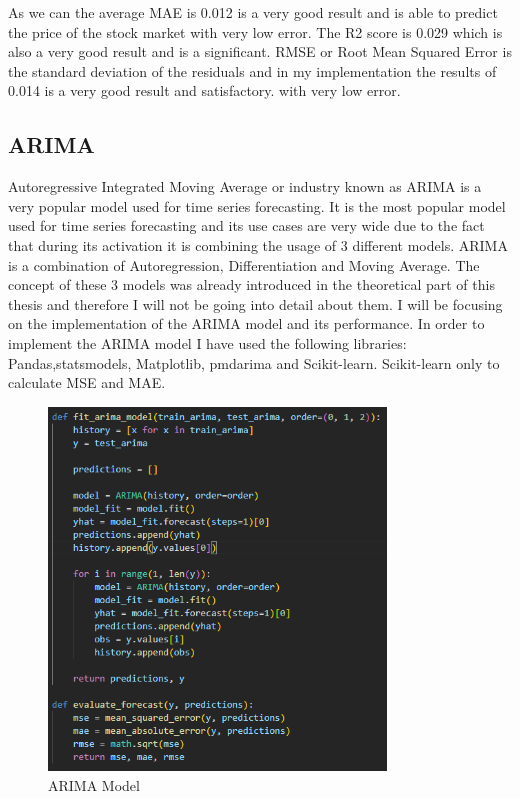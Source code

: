 \documentclass{imc-inf}
\begin{document}
	
	
	As we can the average MAE is 0.012 is a very good result and is able to predict the price of the stock market with very low error. The R2 score is 0.029 which is also a very good result and is a significant.
	RMSE or Root Mean Squared Error is the standard deviation of the residuals and in my implementation the results of  0.014 is a very good result and satisfactory.
	with very low error.
	\subsection{ARIMA}
	Autoregressive Integrated Moving Average or industry known as ARIMA is a very popular model used for time series forecasting. It is the most popular model used for time series forecasting and its use cases are very wide due 
	to the fact that during its activation it is combining the usage of 3 different models. ARIMA is a combination of Autoregression, Differentiation and Moving Average. The concept of these 3 models was already 
	introduced in the theoretical part of this thesis and therefore I will not be going into detail about them. I will be focusing on the implementation of the ARIMA model and its performance.
	In order to implement the ARIMA model I have used the following libraries: Pandas,statsmodels, Matplotlib, pmdarima and Scikit-learn. Scikit-learn only to calculate MSE and MAE.
	\begin{figure}
		\centering
		\includegraphics[width=0.8\textwidth]{arima_code.png}
		\caption{ARIMA Model}
		\label{fig:arima_model}		
	\end{figure}
\end{document}
